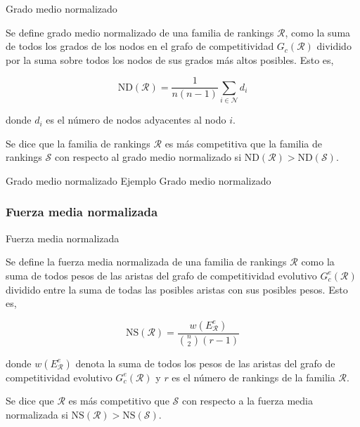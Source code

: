 \documentclass[11pt]{beamer}
\begin{document}
	\begin{frame}{Grado medio normalizado}
		\begin{defi}
			Se define grado medio normalizado de una familia de rankings $\mathcal{R}$, como la suma de todos los grados de los nodos en el grafo de competitividad $G_c(\mathcal{R})$ dividido por la suma sobre todos los nodos de sus grados más altos posibles. Esto es,
			
			\begin{equation}
			\mathrm{ND}(\mathcal{R}) = \dfrac{1}{n(n-1)} \sum_{i \in \mathcal{N}} d_i
			\end{equation}
			
			donde $d_i$ es el número de nodos adyacentes al nodo  $i$.
		\end{defi}
		
		\begin{defi}
			Se dice que la familia de rankings $\mathcal{R}$ es más competitiva que la familia de rankings $\mathcal{S}$ con respecto al grado medio normalizado si $\mathrm{ND}(\mathcal{R}) > \mathrm{ND}(\mathcal{S})$.
		\end{defi}
	\end{frame}
	
	\begin{frame}{Grado medio normalizado}
		Ejemplo Grado medio normalizado
	\end{frame}
	
	\subsubsection{Fuerza media normalizada}
	
	\begin{frame}{Fuerza media normalizada}
		\begin{defi}
			Se define la fuerza media normalizada de una familia de rankings $\mathcal{R}$ como la suma de todos pesos de las aristas del grafo de competitividad evolutivo $G_c^e(\mathcal{R})$ dividido entre la suma de todas las posibles aristas con sus posibles pesos. Esto es,
			
			\begin{equation}
			\mathrm{NS}(\mathcal{R}) = \dfrac{w(E_\mathcal{R}^e)}{\binom{n}{2} (r-1)}
			\end{equation} 
			
			donde $w(E_\mathcal{R}^e)$ denota la suma de todos los pesos de las aristas del grafo de competitividad evolutivo $G_c^e(\mathcal{R})$ y $r$ es el número de rankings de la familia $\mathcal{R}$.
		\end{defi}
		
		\begin{defi}
			Se dice que $\mathcal{R}$ es más competitivo que $\mathcal{S}$ con respecto a la fuerza media normalizada si $\mathrm{NS}(\mathcal{R}) > \mathrm{NS}(\mathcal{S})$.
		\end{defi}
	\end{frame}
	
\end{document}
